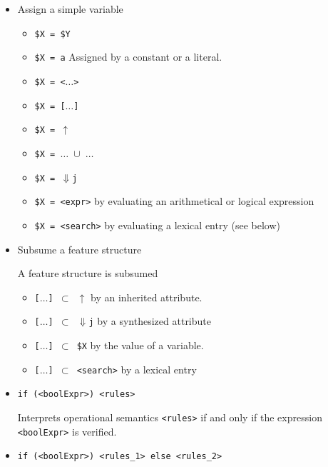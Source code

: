 \documentclass[11pt]{article}
\begin{document}
\begin{itemize}
\begin{itemize}
    \item  Assign a simple variable
    
      \begin{itemize}
      \item \verb#$X = $Y#
      \item \verb#$X = a# Assigned by a constant or a literal.
      \item \verb#$X = <#$\dots$\verb#>#
      \item \verb#$X = [#$\dots$\verb#]#
      \item \verb#$X = #$\uparrow$
      \item \verb#$X = #$\dots$\verb# #$\cup$\verb# #$\dots$
      \item \verb#$X = #$\Downarrow$\verb#j#
      \item \verb#$X = <expr>#  by evaluating an arithmetical or logical expression
      \item \verb#$X = <search># by evaluating a lexical entry (see below)
      \end{itemize}
      
    \item Subsume a feature structure
    
      A feature structure is subsumed

      \begin{itemize}
      \item \verb#[#$\dots$\verb#] #$\subset$\verb# #$\uparrow$ by an inherited attribute.
      \item \verb#[#$\dots$\verb#] #$\subset$\verb# #$\Downarrow$\verb#j# by a synthesized attribute
      \item \verb#[#$\dots$\verb#] #$\subset$\verb# $X# by the value of a variable.
      \item \verb#[#$\dots$\verb#] #$\subset$\verb# <search># by a lexical entry
      \end{itemize}
      


    \item \verb#if (<boolExpr>) <rules>#
    
      Interprets operational semantics \verb#<rules># if and only
      if the expression \verb#<boolExpr># is verified.

    \item \verb#if (<boolExpr>) <rules_1> else <rules_2>#
      

\end{itemize}
\end{itemize}
\end{document}

